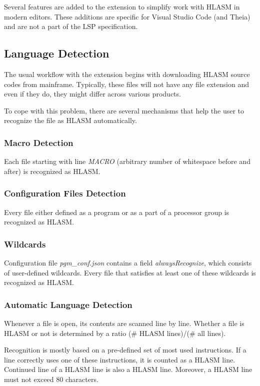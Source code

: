 Several features are added to the extension to simplify work with HLASM in modern editors. These additions are specific for Visual Studio Code (and Theia) and are not a part of the LSP specification.

\subsection{Language Detection}

The usual workflow with the extension begins with downloading HLASM source codes from mainframe. Typically, these files will not have any file extension and even if they do, they might differ across various products.

To cope with this problem, there are several mechanisms that help the user to recognize the file as HLASM automatically.

\subsubsection{Macro Detection}

Each file starting with line \emph{MACRO} (arbitrary number of whitespace before and after) is recognized as HLASM.

\subsubsection{Configuration Files Detection}

Every file either defined as a program or as a part of a processor group is recognized as HLASM.

\subsubsection{Wildcards}
\label{section:wildcard}
Configuration file \emph{pgm\_conf.json} contains a field \emph{alwaysRecognize}, which consists of user-defined wildcards. Every file that satisfies at least one of these wildcards is recognized as HLASM.

\subsubsection{Automatic Language Detection}

Whenever a file is open, its contents are scanned line by line. Whether a file is HLASM or not is determined by a ratio (\# HLASM lines)/(\# all lines).

Recognition is mostly based on a pre-defined set of most used instructions. If a line correctly uses one of these instructions, it is counted as a HLASM line. Continued line of a HLASM line is also a HLASM line.
Moreover, a HLASM line must not exceed 80 characters.

